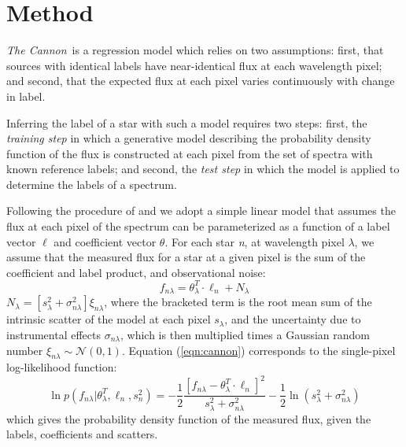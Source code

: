 \documentclass[twocolumn]{aastex62}
\newcommand{\thecannon}{\textsl{The Cannon}}
\begin{document}
\section{Method} \label{sec:methods}

\thecannon\ is a regression model which relies on two assumptions: first, that sources with identical labels have near-identical flux at each wavelength pixel; and second, that the expected flux at each pixel varies continuously with change in label. 

Inferring the label of a star with such a model requires two steps: first, the \emph{training step} in which a generative model describing the probability density function of the flux is constructed at each pixel from the set of spectra with known reference labels; and second, the \emph{test step} in which the model is applied to determine the labels of a spectrum.

Following the procedure of \citet{Ness:2015} and \citet{Ho:2017a} we adopt a simple linear model that assumes the flux at each pixel of the spectrum can be parameterized as a function of a label vector $\ell$ and coefficient vector \emph{$\theta$}. For each star \emph{n}, at wavelength pixel \emph{$\lambda$}, we assume that the measured flux for a star at a given pixel is the sum of the coefficient and label product, and observational noise:
\begin{equation}
	f_{n\lambda} = \theta_{\lambda}^{T} \cdot \ell_{n} + N_{\lambda} \label{eqn:cannon}
\end{equation} 
\color{red}{\bf Here we use the noise model }\color{black} $N_{\lambda}=[s_{\lambda}^2 + \sigma_{n\lambda}^2]\xi_{n\lambda}$, where the bracketed term is the root mean sum of the intrinsic scatter of the model at each pixel \emph{$s_{\lambda}$}, and the uncertainty due to instrumental effects \emph{$\sigma_{n\lambda}$}, which is then multiplied times a Gaussian random number $\xi_{n\lambda} \sim \mathcal{N} (0,1)$. Equation (\ref{eqn:cannon}) corresponds to the single-pixel log-likelihood function:
\begin{equation}
	\ln p(f_{n\lambda}|\theta^T_{\lambda}, \ell_n, s^2_n) = 
	-\frac{1}{2}\frac{[f_{n\lambda} - \theta_{\lambda}^{T} \cdot \ell_{n}]^2}{s_{\lambda}^2 + \sigma_{n\lambda}^2} - \frac{1}{2} \ln(s_{\lambda}^2 + \sigma_{n\lambda}^2) 
	\label{eqn:likelihood}
\end{equation}
which gives the probability density function of the measured flux, given the labels, coefficients and scatters.
\end{document}
